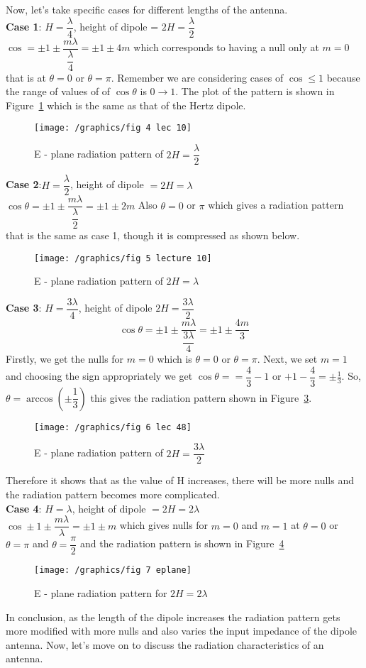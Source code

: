 Now, let's take specific cases for different lengths of the antenna.\\
\textbf{Case 1}: $H =\dfrac{\lambda}{4}$, height of dipole = $2H = \dfrac{\lambda}{2}$\\
$\cos = \pm1 \pm \dfrac{m\lambda}{\dfrac{\lambda}{4}} = \pm1 \pm 4m$ which corresponds to having a null only at $m = 0$ that is at $\theta = 0$ or $\theta = \pi$. Remember we are considering cases of $\cos\leq1$ because the range of values of of $\cos \theta$ is $0\rightarrow1$. The plot of the  pattern is shown in Figure~\ref{figure4} which is the same as that of the Hertz dipole.
\begin{figure}[h]
\centering
\texttt{[image: /graphics/fig 4 lec 10]}
\caption{E - plane radiation pattern of $2H = \dfrac{\lambda}{2}$}
\label{figure4}
\end{figure}

\textbf{Case 2}:$H = \dfrac{\lambda}{2}$, height of dipole $=2H =\lambda$\\
$\cos \theta = \pm 1 \pm \dfrac{m\lambda}{\dfrac{\lambda}{2}} = \pm 1 \pm 2m$
Also $\theta = 0$ or $\pi$ which gives a radiation pattern that is the same as case 1, though it is compressed as shown below. 
\begin{figure}[h]
\centering
\texttt{[image: /graphics/fig 5 lecture 10]}
\caption{E - plane radiation pattern of $2H = \lambda$}
\label{figure5}
\end{figure}

\textbf{Case 3}: $H = \dfrac{3\lambda}{4}$, height of dipole $2H = \dfrac{3\lambda}{2}$\\
$$\cos \theta = \pm1 \pm \dfrac{m\lambda}{\dfrac{3\lambda}{4}} = \pm 1\pm \dfrac{4m}{3}$$
Firstly, we get the nulls for $m=0$ which is $\theta = 0$ or $\theta = \pi$. Next, we set $m=1$ and choosing the sign appropriately we get $\cos \theta = =\dfrac{4}{3} - 1$ or $+1-\dfrac{4}{3}=\pm\frac{1}{3}$. So, $\theta = \arccos(\pm \dfrac{1}{3})$
this gives the radiation pattern shown in Figure~\ref{figure6}.
\begin{figure}[h]
\centering
\texttt{[image: /graphics/fig 6 lec 48]}
\caption{E - plane radiation pattern of $2H = \dfrac{3\lambda}{2}$}
\label{figure6}
\end{figure}

Therefore it shows that as the value of H increases, there will be more nulls and the radiation pattern becomes more complicated.\\
\textbf{Case 4}: $H = \lambda$, height of dipole $ =2H = 2\lambda$\\
$\cos \pm 1 \pm \dfrac{m\lambda}{\lambda} = \pm1 \pm m$ which gives nulls for $m = 0$ and $m= 1$ at $\theta =0$ or $\theta = \pi$ and $\theta = \dfrac{\pi}{2}$ and the radiation pattern is shown in Figure~\ref{figure7}
\begin{figure}[h]
\centering
\texttt{[image: /graphics/fig 7 eplane]}
\caption{E - plane radiation pattern for $2H = 2\lambda$}
\label{figure7}
\end{figure}

In conclusion, as the length of the dipole increases the radiation pattern gets more modified with more nulls and also varies the input impedance of the dipole antenna. Now, let's move on to discuss the radiation characteristics of an antenna.